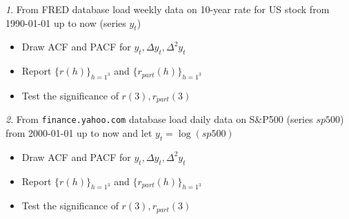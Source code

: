 \documentclass[12pt]{article}
\theoremstyle{remark}
\newtheorem{exercise}{}[section]
\begin{document}
\begin{exercise}
From FRED database load weekly data on 10-year rate  for US stock from 1990-01-01 up to now
(series \(y_t\))
\begin{itemize}
	\item Draw ACF and PACF for \(y_t, \Delta y_t, \Delta^2 y_t\)
	\item Report \(\{r(h)\}_{h=1^3}\) and \(\{r_{part}(h)\}_{h=1^3}\) 
	\item Test the significance of \(r(3),r_{part}(3)\)
\end{itemize}
\end{exercise}

\begin{exercise}
From \texttt{finance.yahoo.com} database load daily data on S\&P500 (series \(sp500\))
from 2000-01-01 up to now and let \(y_t=\log(sp500)\)
\begin{itemize}
	\item Draw ACF and PACF for \(y_t, \Delta y_t, \Delta^2 y_t\)
	\item Report \(\{r(h)\}_{h=1^3}\) and \(\{r_{part}(h)\}_{h=1^3}\) 
	\item Test the significance of \(r(3),r_{part}(3)\)
\end{itemize}
\end{exercise}
\end{document}
